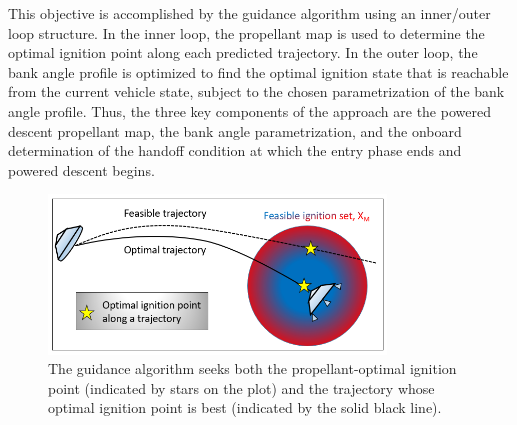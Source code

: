 \documentclass[letterpaper, preprint, paper,11pt]{AAS}
\begin{document}
This objective is accomplished by the guidance algorithm using an inner/outer loop structure. In the inner loop, the propellant map is used to determine the optimal ignition point along each predicted trajectory. In the outer loop, the bank angle profile is optimized to find the optimal ignition state that is reachable from the current vehicle state, subject to the chosen parametrization of the bank angle profile. Thus, the three key components of the approach are the powered descent propellant map, the bank angle parametrization, and the onboard determination of the handoff condition at which the entry phase ends and powered descent begins.


 

%
%
\begin{figure}[h!]
	\centering
	\includegraphics[width=0.8\textwidth]{Optimization} 
	\caption{The guidance algorithm seeks both the propellant-optimal ignition point (indicated by stars on the plot) and the trajectory whose optimal ignition point is best (indicated by the solid black line).}
	\label{fig_optimization}
\end{figure}

\end{document}
